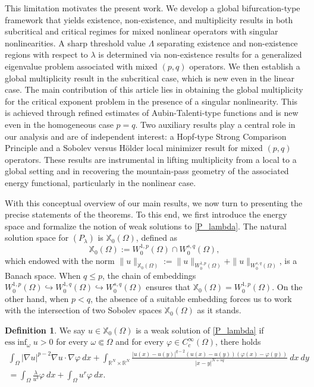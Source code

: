 \documentclass[reqno,oneside]{amsart}
\theoremstyle{definition}
\newtheorem{definition}[theorem]{Definition}
\theoremstyle{remark}
\numberwithin{equation}{section}
\newcommand{\Om} {\Omega}
\newcommand{\sr}{\mathbb{R}}
\newcommand{\na} {\nabla}
\newcommand{\wop}{W^{1,p}_0 (\Omega)}
\newcommand{\la} {\lambda}
\newcommand{\test}{C_c^{\infty} (\Om)}
\begin{document}
This limitation motivates the present work. We develop a global bifurcation-type framework that yields existence, non-existence, and multiplicity results in both subcritical and critical regimes for mixed nonlinear operators with singular nonlinearities. A sharp threshold value $\Lambda$ separating existence and non-existence regions with respect to $\lambda$ is determined via non-existence results for a generalized eigenvalue problem associated with mixed $(p,q)$ operators.
We then establish a global multiplicity result in the subcritical case, which is new even in the linear case. The main contribution of this article lies in obtaining the global multiplicity for the critical exponent problem in the presence of a singular nonlinearity. This is achieved through refined estimates of Aubin-Talenti-type functions and is new even in the homogeneous case $p=q$. Two auxiliary results play a central role in our analysis and are of independent interest: a Hopf-type Strong Comparison Principle and a Sobolev versus H\"older local minimizer result for mixed $(p,q)$ operators. These results are instrumental in lifting multiplicity from a local to a global setting and in recovering the mountain-pass geometry of the associated energy functional, particularly in the nonlinear case.

With this conceptual overview of our main results, we now turn to presenting the precise statements of the theorems. To this end, we first introduce the energy space and formalize the notion of weak solutions to \eqref{P_lambda}. The natural solution space for  $(P_\lambda)$ is $\mathbb{X}_0 (\Om)$, defined as  $$\mathbb{X}_0 (\Om):= \wop \cap W^{s,q}_0 (\Om),$$ which endowed with the norm $\|u \|_{\mathbb{X}_0 (\Om)}:= \|u\|_{\wop} + \|u\|_{W^{s,q}_0 (\Om)}$, is a Banach space. When $q \leq p$, the chain of embeddings $\wop \hookrightarrow W^{1,q}_0(\Om) \hookrightarrow W^{s,q}_0 (\Om)$ ensures that $\mathbb{X}_0 (\Om) = \wop.$  On the other hand, when $p<q$, the absence of a suitable embedding forces us to work with the intersection of two Sobolev spaces $\mathbb{X}_0 (\Om)$ as it stands.

\begin{definition}
    We say $u\in \mathbb{X}_0(\Om)$ is a weak solution of \eqref{P_lambda} if $\text{ess}\inf_{\omega}  u >0$ for every $\omega\Subset\Om$ and for every $\varphi\in\test$, there holds
    \begin{multline*}
        \int_{\Om} |\na u|^{p-2} \na u \cdot \na \varphi\ dx + \int_{\sr^N \times \sr^N} \frac{|u(x) - u(y)|^{q-2} (u(x) - u(y)) (\varphi(x) - \varphi(y))}{|x-y|^{N+sq}}\ dx\ dy\\
        = \int_{\Om} \frac{\la}{u^{\delta}} \varphi\ dx + \int_{\Om} u^r \varphi\ dx.
    \end{multline*}
\end{definition}
\end{document}
